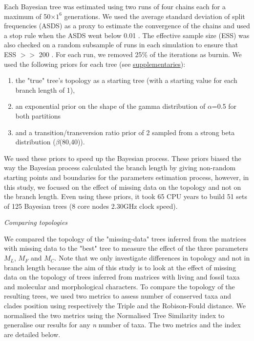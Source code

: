 \documentclass[12pt,letterpaper]{article}
\renewcommand{\subsection}[1]{%
\bigskip
\begin{center}
\begin{large}
\normalfont\itshape #1
\end{large}
\end{center}}
\begin{document}
Each Bayesian tree was estimated using two runs of four chains each for a maximum of 50$\times$$1^6$ generations.
We used the average standard deviation of split frequencies (ASDS) as a proxy to estimate the convergence of the chains and used a stop rule when the ASDS went below 0.01 \citep{Ronquist2012mrbayes}.
The effective sample size (ESS) was also checked on a random subsample of runs in each simulation to ensure that ESS $>>$ 200 \citep{drummond2006ess}.
For each run, we removed 25\% of the iterations as burnin.
We used the following priors for each tree (see \hyperref[supplementaries]{supplementaries}):
\begin{enumerate}
\item
the "true" tree’s topology as a starting tree (with a starting value for each branch length of 1),
\item
an exponential prior on the shape of the gamma distribution of $\alpha$=0.5 for both partitions
\item
and a transition/transversion ratio prior of 2 sampled from a strong beta distribution ($\beta$(80,40)).
\end{enumerate}

We used these priors to speed up the Bayesian process.
These priors biased the way the Bayesian process calculated the branch length by giving non-random starting points and boundaries for the parameters estimation process, however, in this study, we focused on the effect of missing data on the topology and not on the branch length.
Even using these priors, it took 65 CPU years to build 51 sets of 125 Bayesian trees (8 core nodes 2.30GHz clock speed).


\subsection{Comparing topologies}
We compared the topology of the "missing-data" trees inferred from the matrices with missing data to the "best" tree to measure the effect of the three parameters $M_{L}$, $M_{F}$ and $M_{C}$.
Note that we only investigate differences in topology and not in branch length because the aim of this study is to look at the effect of missing data on the topology of trees inferred from matrices with living and fossil taxa and molecular and morphological characters.
To compare the topology of the resulting trees, we used two metrics to assess number of conserved taxa and clades position using respectively the Triple \citep{dobson1975triplets} and the Robison-Fould \citep{RF1981} distance.
We normalised the two metrics using the Normalised Tree Similarity index \citep{Bogdanowicz2012} to generalise our results for any \textit{n} number of taxa. The two metrics and the index are detailed below.
\end{document}
